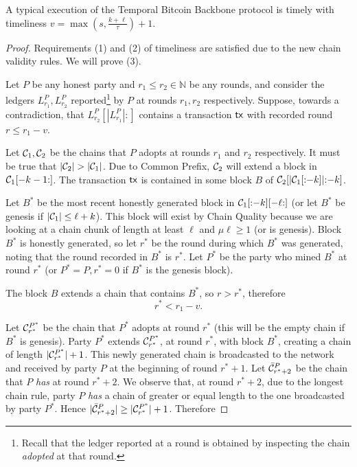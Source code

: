 \begin{theorem}
  A typical execution of the Temporal Bitcoin Backbone protocol is timely
  with timeliness $v = \max(s, \frac{k + \ell}{\tau}) + 1$.
\end{theorem}
\begin{proof}
  Requirements (1) and (2) of timeliness are satisfied due to the new chain validity rules.
  We will prove (3).

  Let $P$ be any honest party and $r_1 \leq r_2 \in \mathbb{N}$ be any rounds, and consider
  the ledgers $L^P_{r_1}, L^P_{r_2}$ reported\footnote{
    Recall that the ledger reported at a round is obtained by inspecting the
    chain \emph{adopted} at that round.
  } by $P$ at rounds $r_1, r_2$ respectively.
  Suppose, towards a contradiction, that $L^P_{r_2}[|L^P_{r_1}|{:}]$ contains a transaction
  $\textsf{tx}$ with recorded round $r \leq r_1 - v$.

  Let $\mathcal{C}_1, \mathcal{C}_2$ be the chains that $P$ adopts at rounds $r_1$
  and $r_2$ respectively.
  It must be true that $|\mathcal{C}_2| > |\mathcal{C}_1|$.
  Due to Common Prefix, $\mathcal{C}_2$ will extend a block in $\mathcal{C}_1[-k-1{:}]$.
  The transaction $\textsf{tx}$ is contained in some block $B$ of $\mathcal{C}_2[|\mathcal{C}_1[{:}{-k}]|{:}{-k}]$.

  Let $B^*$ be the most recent
  honestly generated block in $\mathcal{C}_1[{:}{-k}][{-\ell}{:}]$
  (or let $B^*$ be genesis if $|\mathcal{C}_1| \leq \ell + k$).
  This block will exist by
  Chain Quality because we are looking at a chain chunk of length at least $\ell$ and
  $\mu\ell \geq 1$ (or is genesis).
  Block $B^*$ is honestly generated, so let $r^*$ be the round
  during which $B^*$ was generated, noting that the round recorded in $B^*$ is $r^*$.
  Let $P^*$ be the party who mined $B^*$ at round $r^*$ (or $P^* = P, r^* = 0$ if $B^*$ is
  the genesis block).

  The block $B$ extends a chain that contains $B^*$, so $r > r^*$,
  therefore
  \begin{equation}
    r^* < r_1 - v\label{eq:bitcoin-r-bound}.
  \end{equation}

  Let $\mathcal{C}^{P^*}_{r^*}$ be the chain that $P^*$ adopts at
  round $r^*$ (this will be the empty chain if $B^*$ is genesis).
  Party $P^*$ extends $\mathcal{C}^{P^*}_{r^*}$, at round $r^*$, with block $B^*$,
  creating a chain of length $|\mathcal{C}^{P^*}_{r^*}| + 1$.
  This newly generated chain is broadcasted to the network and
  received by party $P$ at the beginning of round $r^* + 1$.
  Let $\bar {\mathcal{C}}^P_{r^* + 2}$ be the chain
  that $P$ \emph{has} at round $r^* + 2$.
  We observe that, at round $r^* + 2$, due to the
  longest chain rule, party $P$ \emph{has} a chain of greater or equal
  length to the one broadcasted by party $P^*$. Hence
  $|\bar {\mathcal{C}}^P_{r^* + 2}| \geq |\mathcal{C}^{P^*}_{r^*}| + 1$. Therefore


\end{proof}
